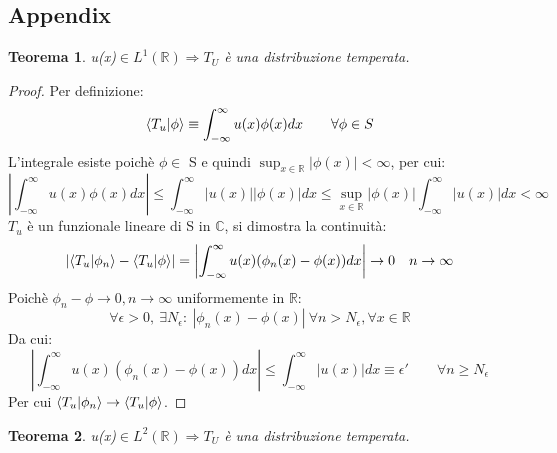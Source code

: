 \documentclass[twoside]{article}
\newtheorem{theorem}{Teorema}[section]
\begin{document}
\subsection{Appendix}
\begin{theorem}
u(x)$\in L^1(\mathds{R})\Longrightarrow T_U$ è una distribuzione temperata.
\end{theorem}
\begin{proof}
Per definizione:
\begin{equation}
    \bra{T_u}\ket{\phi}\equiv\int_{-\infty}^\infty u(x)\phi(x)dx \qquad \forall \phi\in S
\end{equation}
L'integrale esiste poichè $\phi\in$ S e quindi $\sup_{x\in\mathds{R}}|\phi(x)|<\infty$, per cui:
\begin{equation}
    \left|\int_{-\infty}^\infty u(x)\phi(x)dx\right|\le \int_{-\infty}^\infty |u(x)||\phi(x)|dx\le \sup_{x\in\mathds{R}}|\phi(x)|\int_{-\infty}^\infty|u(x)|dx<\infty
\end{equation}
$T_u$ è un funzionale lineare di S in $\mathds{C}$, si dimostra la continuità:
\begin{equation}
    \left|\bra{T_u}\ket{\phi_n}-\bra{T_u}\ket{\phi}\right|=\left|\int_{-\infty}^\infty u(x)(\phi_n(x)-\phi(x))dx\right|\to 0 \quad n\to\infty
\end{equation}
Poichè $\phi_n-\phi\to 0, n\to\infty$ uniformemente in $\mathds{R}$:
\begin{equation}
    \forall \epsilon>0,\ \exists N_\epsilon:\ |\phi_n(x)-\phi(x)| \ \forall n>N_\epsilon,\forall x\in \mathds{R}
\end{equation}
Da cui:
\begin{equation}
    \left|\int_{-\infty}^\infty u(x)(\phi_n(x)-\phi(x))dx\right|\le \int_{-\infty}^\infty|u(x)|dx\equiv \epsilon' \qquad \forall n\ge N_\epsilon
\end{equation}
Per cui $\bra{T_u}\ket{\phi_n}\to\bra{T_u}\ket{\phi}$.
\end{proof}
\vspace{0.8cm}
\begin{theorem}
u(x)$\in L^2(\mathds{R})\Longrightarrow T_U$ è una distribuzione temperata.
\end{theorem}
\end{document}
